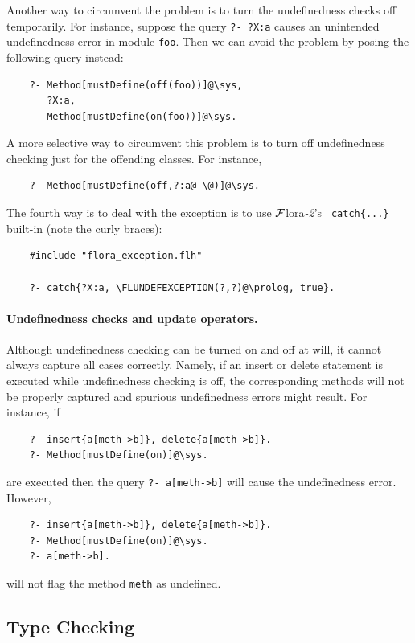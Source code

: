 \documentclass[11pt]{article}
\newcommand{\FLSYSTEM}{{\mbox{\sc ${\cal F}${lora}\rm\emph{-2}}}\xspace}
\newcommand{\FLUNDEFEXCEPTION}{FLORA\_UNDEFINED\_EXCEPTION}
\begin{document}
Another way to circumvent  the problem is to turn the undefinedness checks
off temporarily. For instance, suppose the query {\tt ?- ?X:a} causes
an unintended undefinedness error in module {\tt foo}. Then we can avoid the
problem by posing the following query instead:
\begin{verbatim}
    ?- Method[mustDefine(off(foo))]@\sys,
       ?X:a,
       Method[mustDefine(on(foo))]@\sys.
\end{verbatim}
A more selective way to circumvent this problem is to turn off
undefinedness checking just for the offending classes. For instance,
\begin{verbatim}
    ?- Method[mustDefine(off,?:a@ \@)]@\sys.
\end{verbatim}

The fourth way is to deal with the exception is to use \FLSYSTEM's {\tt
  catch\{...\}} built-in (note the curly braces):
\begin{verbatim}
    #include "flora_exception.flh"

    ?- catch{?X:a, \FLUNDEFEXCEPTION(?,?)@\prolog, true}.
\end{verbatim}

\paragraph{Undefinedness checks and update operators.}
Although undefinedness checking can be turned on and off at will, it cannot
always capture all cases correctly. Namely, if an insert or delete
statement is executed while undefinedness checking is off, the
corresponding methods will not be properly captured and spurious
undefinedness errors might result.
For instance, if
\begin{verbatim}
    ?- insert{a[meth->b]}, delete{a[meth->b]}.
    ?- Method[mustDefine(on)]@\sys.
\end{verbatim}
are executed then the query {\tt ?- a[meth->b]} will cause the
undefinedness error. However,
\begin{verbatim}
    ?- insert{a[meth->b]}, delete{a[meth->b]}.
    ?- Method[mustDefine(on)]@\sys.
    ?- a[meth->b].
\end{verbatim}
will not flag the method {\tt meth} as undefined.


\subsection{Type Checking}\label{sec-typechecking}
\end{document}
